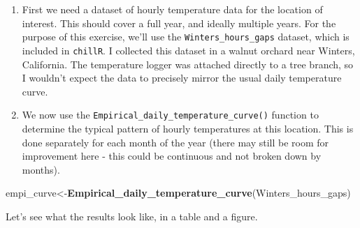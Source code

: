 \documentclass[
]{book}
\newenvironment{Shaded}{\begin{snugshade}}{\end{snugshade}}
\newcommand{\DataTypeTok}[1]{\textcolor[rgb]{0.13,0.29,0.53}{#1}}
\newcommand{\DecValTok}[1]{\textcolor[rgb]{0.00,0.00,0.81}{#1}}
\newcommand{\KeywordTok}[1]{\textcolor[rgb]{0.13,0.29,0.53}{\textbf{#1}}}
\newcommand{\NormalTok}[1]{#1}
\newcommand{\OperatorTok}[1]{\textcolor[rgb]{0.81,0.36,0.00}{\textbf{#1}}}
\newcommand{\StringTok}[1]{\textcolor[rgb]{0.31,0.60,0.02}{#1}}
\begin{document}
\begin{enumerate}
\def\labelenumi{\arabic{enumi})}
\item
  First we need a dataset of hourly temperature data for the location of interest. This should cover a full year, and ideally multiple years. For the purpose of this exercise, we'll use the \texttt{Winters\_hours\_gaps} dataset, which is included in \texttt{chillR}. I collected this dataset in a walnut orchard near Winters, California. The temperature logger was attached directly to a tree branch, so I wouldn't expect the data to precisely mirror the usual daily temperature curve.
\item
  We now use the \texttt{Empirical\_daily\_temperature\_curve()} function to determine the typical pattern of hourly temperatures at this location. This is done separately for each month of the year (there may still be room for improvement here - this could be continuous and not broken down by months).
\end{enumerate}

\begin{Shaded}
\begin{Highlighting}[]
\NormalTok{empi_curve<-}\KeywordTok{Empirical_daily_temperature_curve}\NormalTok{(Winters_hours_gaps)}
\end{Highlighting}
\end{Shaded}

Let's see what the results look like, in a table and a figure.

\begin{Shaded}
\end{Shaded}

\begingroup\fontsize{10}{12}\selectfont
\end{document}
